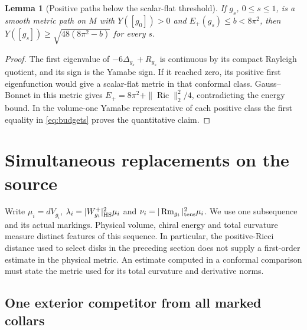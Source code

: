 \documentclass[11pt,letterpaper]{article}
\numberwithin{equation}{section}
\newtheorem{lemma}[theorem]{Lemma}
\theoremstyle{remark}
\DeclareMathOperator{\Ric}{Ric}
\DeclareMathOperator{\Rm}{Rm}
\begin{document}
\begin{lemma}[Positive paths below the scalar-flat threshold]\label{lem:wall}
If \(g_s\), \(0\le s\le1\), is a smooth metric path on \(M\) with
\(Y([g_0])>0\) and \(E_+(g_s)\le b<8\pi^2\), then
\(Y([g_s])\ge\sqrt{48(8\pi^2-b)}\) for every \(s\).
\end{lemma}
\begin{proof}
The first eigenvalue of \(-6\Delta_{g_s}+R_{g_s}\) is continuous by
its compact Rayleigh quotient, and its sign is the Yamabe sign.
If it reached zero, its positive first eigenfunction would give a
scalar-flat metric in that conformal class. Gauss--Bonnet in this
metric gives \(E_+=8\pi^2+\|\Ric\|_2^2/4\), contradicting the
energy bound. In the volume-one Yamabe representative of each
positive class the first equality in \eqref{eq:budgets} proves
the quantitative claim.
\end{proof}











\section{Simultaneous replacements on the source}

Write \(\mu_i=dV_{g_i}\), \(\lambda_i=|W^+_{g_i}|_{\rm HS}^2\mu_i\)
and \(\nu_i=|\Rm_{g_i}|_{\rm tens}^2\mu_i\). We use one subsequence
and its actual markings. Physical volume, chiral energy and total
curvature measure distinct features of this sequence. In particular,
the positive-Ricci distance used to select disks in the preceding
section does not supply a first-order estimate in the physical metric.
An estimate computed in a conformal comparison must state the metric
used for its total curvature and derivative norms.

\subsection{One exterior competitor from all marked collars}
\end{document}
